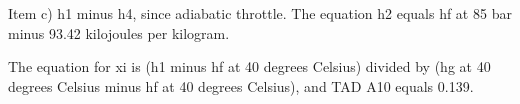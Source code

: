 Item c) h1 minus h4, since adiabatic throttle.
The equation h2 equals hf at 85 bar minus 93.42 kilojoules per kilogram.

The equation for xi is (h1 minus hf at 40 degrees Celsius) divided by (hg at 40 degrees Celsius minus hf at 40 degrees Celsius), and TAD A10 equals 0.139.